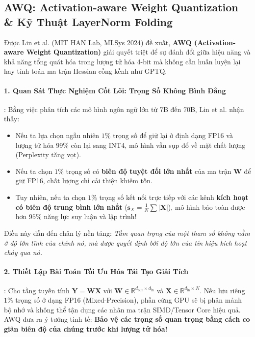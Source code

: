 \subsection{AWQ: Activation-aware Weight Quantization \& Kỹ Thuật LayerNorm Folding}
\label{sec:awq-math-optimization}

Được Lin et al. (MIT HAN Lab, MLSys 2024) đề xuất, \textbf{AWQ (Activation-aware Weight Quantization)} giải quyết triệt để sự đánh đổi giữa hiệu năng và khả năng tổng quát hóa trong lượng tử hóa 4-bit mà không cần huấn luyện lại hay tính toán ma trận Hessian cồng kềnh như GPTQ.

\paragraph{1. Quan Sát Thực Nghiệm Cốt Lõi: Trọng Số Không Bình Đẳng}:
Bằng việc phân tích các mô hình ngôn ngữ lớn từ 7B đến 70B, Lin et al. nhận thấy:
\begin{itemize}
  \item Nếu ta lựa chọn ngẫu nhiên $1\%$ trọng số để giữ lại ở định dạng FP16 và lượng tử hóa $99\%$ còn lại sang INT4, mô hình vẫn sụp đổ về mặt chất lượng (Perplexity tăng vọt).
  \item Nếu ta chọn $1\%$ trọng số có \textbf{biên độ tuyệt đối lớn nhất} của ma trận $\mathbf{W}$ để giữ FP16, chất lượng chỉ cải thiện khiêm tốn.
  \item Tuy nhiên, nếu ta chọn $1\%$ trọng số kết nối trực tiếp với các kênh \textbf{kích hoạt có biên độ trung bình lớn nhất} ($\mathbf{s}_X = \frac{1}{N}\sum |\mathbf{X}|$), mô hình bảo toàn được hơn $95\%$ năng lực suy luận và lập trình!
\end{itemize}
Điều này dẫn đến chân lý nền tảng: \textit{Tầm quan trọng của một tham số không nằm ở độ lớn tĩnh của chính nó, mà được quyết định bởi độ lớn của tín hiệu kích hoạt chảy qua nó.}

\paragraph{2. Thiết Lập Bài Toán Tối Ưu Hóa Tái Tạo Giải Tích}:
Cho tầng tuyến tính $\mathbf{Y} = \mathbf{W} \mathbf{X}$ với $\mathbf{W} \in \mathbb{R}^{d_{\text{out}} \times d_{\text{in}}}$ và $\mathbf{X} \in \mathbb{R}^{d_{\text{in}} \times N}$.
Nếu lưu riêng $1\%$ trọng số ở dạng FP16 (Mixed-Precision), phần cứng GPU sẽ bị phân mảnh bộ nhớ và không thể tận dụng các nhân ma trận SIMD/Tensor Core hiệu quả. AWQ đưa ra ý tưởng tinh tế: \textbf{Bảo vệ các trọng số quan trọng bằng cách co giãn biên độ của chúng trước khi lượng tử hóa!}

